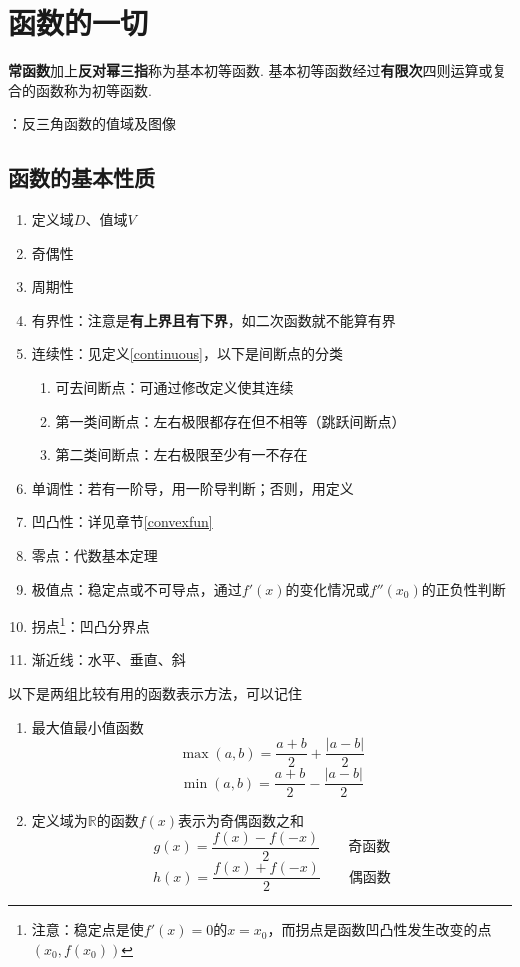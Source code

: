 \section{函数的一切}
\begin{definition}[(基本)初等函数]
\textbf{常函数}加上\textbf{反对幂三指}称为基本初等函数. 基本初等函数经过\textbf{有限次}四则运算或复合的函数称为初等函数. 
\end{definition}
：反三角函数的值域及图像
\subsection{函数的基本性质}
\begin{enumerate}
	\itemsep -3pt
	\item 定义域$D$、值域$V$
	\item 奇偶性
	\item 周期性
	\item 有界性：注意是\textbf{有上界且有下界}，如二次函数就不能算有界
	\item 连续性：见定义\ref{continuous}，以下是间断点的分类
	\begin{enumerate}
		\itemsep -3pt
		\item 可去间断点：可通过修改定义使其连续
		\item 第一类间断点：左右极限都存在但不相等（跳跃间断点）
		\item 第二类间断点：左右极限至少有一不存在
	\end{enumerate}
	\item 单调性：若有一阶导，用一阶导判断；否则，用定义
	\item 凹凸性：详见章节\ref{convexfun}
	\item 零点：代数基本定理
	\item 极值点：稳定点或不可导点，通过$f'(x)$的变化情况或$f''(x_0)$的正负性判断
	\item 拐点\footnote{注意：稳定点是使$f'(x)=0$的$x=x_0$，而拐点是函数凹凸性发生改变的点$(x_0,f(x_0))$}：凹凸分界点
	\item 渐近线：水平、垂直、斜
\end{enumerate}
以下是两组比较有用的函数表示方法，可以记住
\begin{enumerate}
	\item 最大值最小值函数
		\[\max(a,b)=\frac{a+b}{2}+\frac{|a-b|}{2}\]
		\[\min(a,b)=\frac{a+b}{2}-\frac{|a-b|}{2}\]
	\item 定义域为$\mathbb{R}$的函数$f(x)$表示为奇偶函数之和
		\[g(x)=\frac{f(x)-f(-x)}{2}\qquad\mbox{奇函数}\]
		\[h(x)=\frac{f(x)+f(-x)}{2}\qquad\mbox{偶函数}\]
\end{enumerate}

